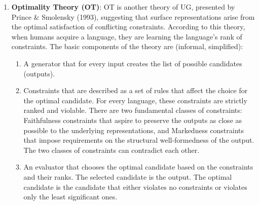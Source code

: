 \documentclass{article}
\begin{document}
\begin{enumerate}
  \item \textbf{Optimality Theory (OT)}: OT is another theory of UG, presented by Prince \& Smolensky (1993), suggesting that surface representations arise from the optimal satisfaction of conflicting constraints. According to this theory, when humans acquire a language, they are learning the language’s rank of constraints. The basic components of the theory are (informal,  simplified):
\begin{enumerate}
  \item A generator that for every input creates the list of possible candidates (outputs).
  \item Constraints that are described as a set of rules that affect the choice for the optimal candidate. For every language, these constraints are strictly ranked and violable. There are two fundamental classes of constraints: Faithfulness constraints that aspire to preserve the outputs as close as possible to the underlying representations, and Markedness constraints that impose requirements on the structural well-formedness of the output. The two classes of constraints can contradict each other. 
  \item An evaluator that chooses the optimal candidate based on the constraints and their ranks. The selected candidate is the output. The optimal candidate is the candidate that either violates no constraints or violates only the least significant ones.
\end{enumerate}


\end{enumerate}
\end{document}
